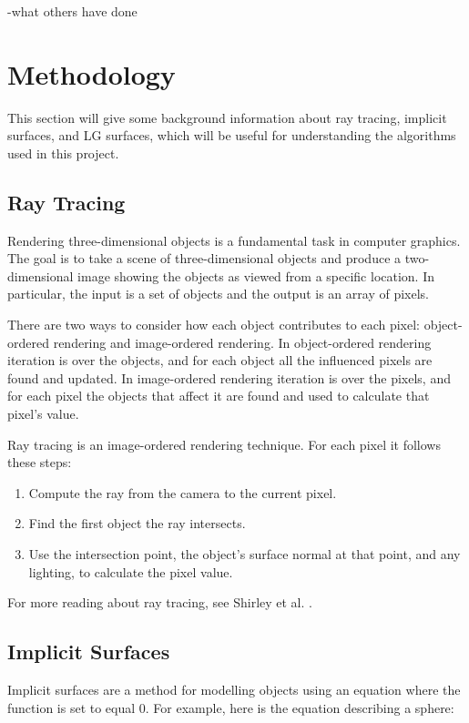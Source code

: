 \documentclass[conference]{acmsiggraph}
\begin{document}
-what others have done

\section{Methodology}

This section will give some background information about ray tracing,
implicit surfaces, and LG surfaces, which will be useful for 
understanding the algorithms used in this project.

\subsection{Ray Tracing}

Rendering three-dimensional objects is a fundamental task in computer 
graphics.  The goal is to take a scene of three-dimensional objects 
and produce a two-dimensional image showing the objects as viewed
from a specific location.  In particular, the input is a set of 
objects and the output is an array of pixels.

There are two ways to consider how each object contributes to each 
pixel: object-ordered rendering and image-ordered rendering.  In
object-ordered rendering iteration is over the objects, and for
each object all the influenced pixels are found and updated.  In
image-ordered rendering iteration is over the pixels, and for each
pixel the objects that affect it are found and used to calculate
that pixel's value.

Ray tracing is an image-ordered rendering technique.  For each pixel
it follows these steps:
\begin{enumerate}
	\item Compute the ray from the camera to the current pixel.
	\item Find the first object the ray intersects.
	\item Use the intersection point, the object's surface normal at that
	point, and any lighting, to calculate the pixel value.
\end{enumerate}

For more reading about ray tracing, see Shirley et al. \cite{Shirley}.

\subsection{Implicit Surfaces}

Implicit surfaces are a method for modelling objects using an equation
where the function is set to equal 0.  For example, here is the 
equation describing a sphere:
\end{document}

